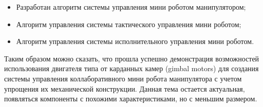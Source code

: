 \begin{itemize}
    \item Разработан алгоритм системы управления мини роботом манипулятором;
    \item Алгоритм управления системы тактического управления мини роботом;
    \item Алгоритм управления системы исполнительного управления мини роботом.
\end{itemize}
Таким образом можно сказать, что прошла успешно демонстрация возможностей использования двигателя типа от карданных камер (gimbal motors) для создания системы управления коллаборативного мини робота манипулятора с учетом упрощения их механической конструкции. Данная тема остается актуальная, появляться компоненты с похожими характеристиками, но с меньшим размером.
